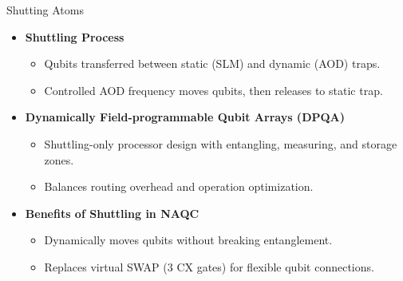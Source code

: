 \documentclass{beamer}
\begin{document}
\begin{frame}{Shutting Atoms}

\begin{itemize}
    \item \textbf{Shuttling Process}
    \begin{itemize}
        \item Qubits transferred between static (SLM) and dynamic (AOD) traps.
        \item Controlled AOD frequency moves qubits, then releases to static trap.
    \end{itemize}
    \item \textbf{Dynamically Field-programmable Qubit Arrays (DPQA)}
    \begin{itemize}
        \item Shuttling-only processor design with entangling, measuring, and storage zones.
        \item Balances routing overhead and operation optimization.
    \end{itemize}
    \item \textbf{Benefits of Shuttling in NAQC}
    \begin{itemize}
        \item Dynamically moves qubits without breaking entanglement.
        \item Replaces virtual SWAP (3 CX gates) for flexible qubit connections.
    \end{itemize}
    
\end{itemize}

\end{frame}
\end{document}
